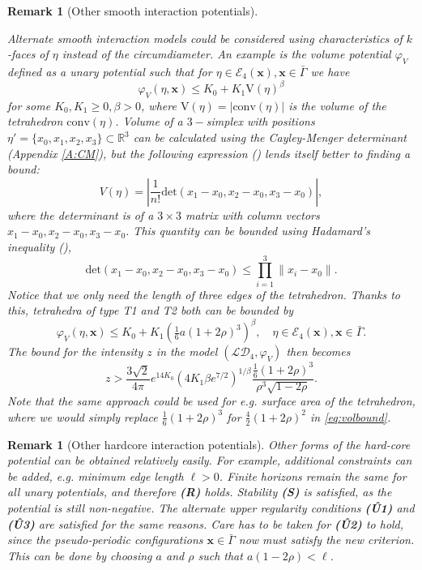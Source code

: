 \documentclass{kybernetika}
\newtheorem{remark}[theorem]{Remark}
\newcommand{\Rt}{{\mathbb R^3}}
\newcommand{\x}{{\mathbf{x}}}
\begin{document}
\begin{remark}[Other smooth interaction potentials]\label{r:otherpotentials}
	
	Alternate smooth interaction models could be considered using characteristics of $k$-faces of $\eta$ instead of the circumdiameter. An example is the volume potential $\varphi_{V}$ defined as a unary potential such that for $\eta\in\mathcal E_4(\x), \x \in \bar\Gamma$  we have
	$$\varphi_{V}(\eta,\x) \leq K_0 + K_1 \mathrm{V}(\eta)^{\beta}$$
	for some $K_0,K_1 \geq 0, \beta >0$, where $\mathrm{V}(\eta)=|\mathrm{conv}(\eta)|$ is the volume of the tetrahedron $\mathrm{conv}(\eta)$. Volume of a $3-$simplex with positions $\eta'=\{x_0,x_1,x_2,x_3\}\subset \Rt$ can be calculated using the Cayley-Menger determinant (Appendix \ref{A:CM}), but the following expression (\cite{Stein1966}) lends itself better to finding a bound: 
	$$V(\eta)=\left| \frac 1{n!} \mathrm{det}(x_1-x_0,x_2-x_0,x_3-x_0) \right|,$$
	where the determinant is of a $3 \times 3$ matrix with column vectors $x_1-x_0,x_2-x_0,x_3-x_0$. This quantity can be bounded using Hadamard's inequality (\cite{Hadamard1893}),
	$$\mathrm{det}(x_1-x_0,x_2-x_0,x_3-x_0) \leq \prod^3_{i=1} \|x_i - x_0\| .$$
	Notice that we only need the length of three edges of the tetrahedron. Thanks to this, tetrahedra of type T1 and T2 both can be bounded by
	$$\varphi_V(\eta,\x) \leq K_0 + K_1 \left(\tfrac 16 a(1+2\rho)^3\right)^{\beta}, \quad \eta\in\mathcal E_4(\x), \x\in \bar \Gamma.$$
	The bound for the intensity $z$ in the model $(\mathcal {LD}_4, \varphi_V)$ then becomes
	\begin{equation}\label{eq:volbound}z> \frac{3\sqrt 2}{4\pi}e^{14 K_0}   (4K_1 \beta e^{7/2})^{1/\beta} \frac{\frac 16 (1+2\rho)^3}{\rho^3 \sqrt{1-2\rho}}.\end{equation}
	Note that the same approach could be used for e.g. surface area of the tetrahedron, where we would simply replace $\tfrac 16 (1+2\rho)^3$ for $\tfrac 42 (1+2\rho)^2$ in \eqref{eq:volbound}.  \newline

\end{remark}


\begin{remark}[Other hardcore interaction potentials]
	Other forms of the hard-core potential can be obtained relatively easily. For example, additional constraints can be added, e.g. minimum edge length $\ell>0$. Finite horizons remain the same for all unary potentials, and therefore \textbf{(R)} holds. Stability \textbf{(S)} is satisfied, as the potential is still non-negative. The alternate upper regularity conditions \textbf{(\^{U}1)} and \textbf{(\^{U}3)} are satisfied for the same reasons. Care has to be taken for \textbf{(\^{U}2)} to hold, since the pseudo-periodic configurations $\x\in\bar \Gamma$ now must satisfy the new criterion. This can be done by choosing $a$ and $\rho$ such that $a(1-2\rho) < \ell$.
\end{remark}
\end{document}

